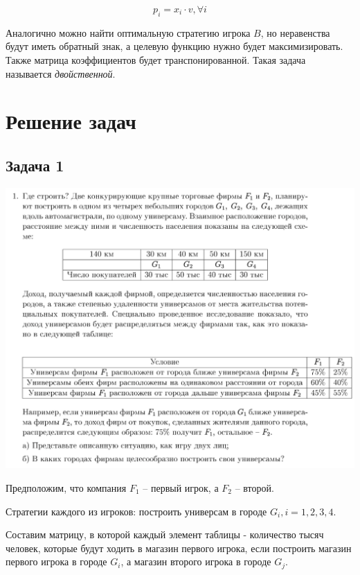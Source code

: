 \documentclass[11pt, a4paper]{article}
\begin{document}
    \begin{equation}
        p_i = x_i\cdot v, \forall i\label{eq:equation8}
    \end{equation}

    Аналогично можно найти оптимальную стратегию игрока $B$, но
    неравенства будут иметь обратный знак, а целевую функцию нужно
    будет максимизировать.
    Также матрица коэффициентов будет транспонированной.
    Такая задача называется \textit{двойственной}.

    \newpage


    \section{Решение задач}\label{sec:solve}

    \subsection{Задача 1}\label{subsec:task1}

    \includegraphics[width=1\textwidth]{docs/1}

    Предположим, что компания $F_1$ -- первый игрок, а $F_2$ -- второй.

    Стратегии каждого из игроков: построить универсам в городе $G_i, i = 1, 2, 3, 4$.

    Составим матрицу, в которой каждый элемент таблицы - количество тысяч человек,
    которые будут ходить в магазин первого игрока,
    если построить магазин первого игрока в городе $G_i$,
    а магазин второго игрока в городе $G_j$.
\end{document}
